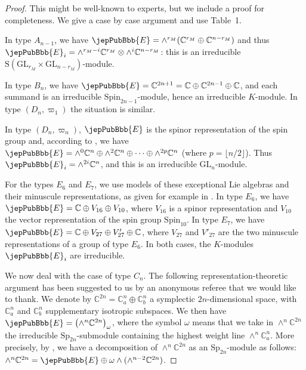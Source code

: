 \begin{proof}
This might be well-known to experts, but we include a proof for completeness. We give a case by case argument and use Table~1.

In type $A_{n-1}$, we have $\jepPubBbb{E}=\wedge^{r_M}(\mathbb C^{r_M}\oplus\mathbb C^{n-r_M})$ and thus $\jepPubBbb{E}_i=\wedge^{r_M-i}\mathbb C^{r_M}\otimes\wedge^i\mathbb C^{n-r_M}$: this is an irreducible $\mathrm S(\mathrm{GL}_{r_M}\times\mathrm{GL}_{n-r_M})$-module.

In type $B_n$, we have $\jepPubBbb{E}=\mathbb C^{2n+1}=\mathbb C\oplus\mathbb C^{2n-1}\oplus\mathbb C$, and each summand is an irreducible $\mathrm{Spin}_{2n-1}$-module, hence an irreducible $K$-module. In type $(D_n,\varpi_1)$ the situation is similar.

In type $(D_n,\varpi_n)$, $\jepPubBbb{E}$ is the spinor representation of the spin group and, according to \cite{jep93Che97}, we have $\jepPubBbb{E}=\wedge^0\mathbb C^n\oplus\wedge^2\mathbb C^n\oplus\cdots\oplus\wedge^{2p}\mathbb C^n$ (where $p=\lfloor n/2\rfloor$). Thus $\jepPubBbb{E}_i=\wedge^{2i}\mathbb C^n$, and this is an irreducible $\mathrm{GL}_n$-module.

For the types $E_6$ and $E_7$, we use models of these exceptional Lie algebras and their minuscule representations, as given for example in \cite{jep93Man06}. In type $E_6$, we have $\jepPubBbb{E}=\mathbb C\oplus V_{16}\oplus V_{10}$, where $V_{16}$ is a spinor representation and $V_{10}$ the vector representation of the spin group $\mathrm{Spin}_{10}$. In type $E_7$, we have $\jepPubBbb{E}=\mathbb C\oplus V_{27}\oplus V'_{27}\oplus\mathbb C$, where $V_{27}$ and $V'_{27}$ are the two minuscule representations of a group of type $E_6$. In both cases, the $K$-modules $\jepPubBbb{E}_i$ are irreducible.

We now deal with the case of type $C_n$. The following representation-theoretic argument has been suggested to us by an anonymous referee that we would like to thank. We denote by $\mathbb C^{2n}=\mathbb C_a^n\oplus\mathbb C_b^n$ a symplectic $2n$-dimensional space, with $\mathbb C_a^n$ and $\mathbb C_b^n$ supplementary isotropic subspaces. We then have $\jepPubBbb{E}=\bigl(\wedge^n\mathbb C^{2n}\bigr)_\omega$, where the symbol $\omega$ means that we take in $\wedge^n\mathbb C^{2n}$ the irreducible $\mathrm{Sp}_{2n}$-submodule containing the highest weight line $\wedge^n\mathbb C_a^n$. More precisely, by \cite[Th.~17.5]{jep93FH91}, we have a decomposition of $\wedge^n\mathbb C^{2n}$ as an $\mathrm{Sp}_{2n}$-module as follows: $\wedge^n\mathbb C^{2n}=\jepPubBbb{E}\oplus\omega\wedge(\wedge^{n-2}\mathbb C^{2n})$.


\end{proof}
